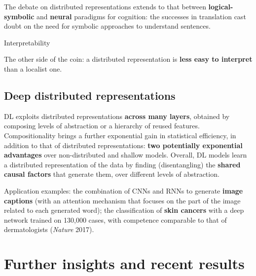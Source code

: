 The debate on distributed representations extends to that between
\textbf{logical-symbolic} and \textbf{neural} paradigms for cognition:
the successes in translation cast doubt on the need for symbolic
approaches to understand sentences.

\begin{boxwarning}{Interpretability}

The other side of the coin: a distributed representation is
\textbf{less easy to interpret} than a localist one.

\end{boxwarning}

\subsection{Deep distributed
representations}\label{rappresentazioni-distribuite-profonde}

DL exploits distributed representations \textbf{across many layers},
obtained by composing levels of abstraction or a hierarchy of reused
features. Compositionality brings a further exponential gain in
statistical efficiency, in addition to that of distributed
representations: \textbf{two potentially exponential advantages} over
non-distributed and shallow models. Overall, DL models learn a
distributed representation of the data by finding (disentangling) the
\textbf{shared causal factors} that generate them, over different
levels of abstraction.

Application examples: the combination of CNNs and RNNs to generate
\textbf{image captions} (with an attention mechanism that focuses on
the part of the image related to each generated word); the
classification of \textbf{skin cancers} with a deep network trained on
130,000 cases, with competence comparable to that of dermatologists
(\emph{Nature} 2017).

\section{Further insights and recent
results}\label{altri-spunti-e-risultati-recenti}

